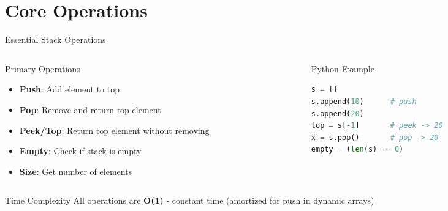 \documentclass[aspectratio=169,xcolor=dvipsnames]{beamer}
\begin{document}
\section{Core Operations}

\begin{frame}[fragile]{Essential Stack Operations}
  \begin{columns}
    \begin{column}{0.5\textwidth}
      \begin{block}{Primary Operations}
        \begin{itemize}
          \item \textbf{Push}: Add element to top
          \item \textbf{Pop}: Remove and return top element
          \item \textbf{Peek/Top}: Return top element without removing
          \item \textbf{Empty}: Check if stack is empty
          \item \textbf{Size}: Get number of elements
        \end{itemize}
      \end{block}
    \end{column}
    \begin{column}{0.45\textwidth}
      \begin{exampleblock}{Python Example}
        \begin{lstlisting}[language=Python,basicstyle=\tiny\ttfamily]
s = []
s.append(10)      # push
s.append(20)
top = s[-1]       # peek -> 20
x = s.pop()       # pop -> 20
empty = (len(s) == 0)
        \end{lstlisting}
      \end{exampleblock}
    \end{column}
  \end{columns}
  
  \vspace{0.5cm}
  
  \begin{alertblock}{Time Complexity}
    All operations are \textbf{O(1)} - constant time (amortized for push in dynamic arrays)
  \end{alertblock}
\end{frame}
\end{document}

